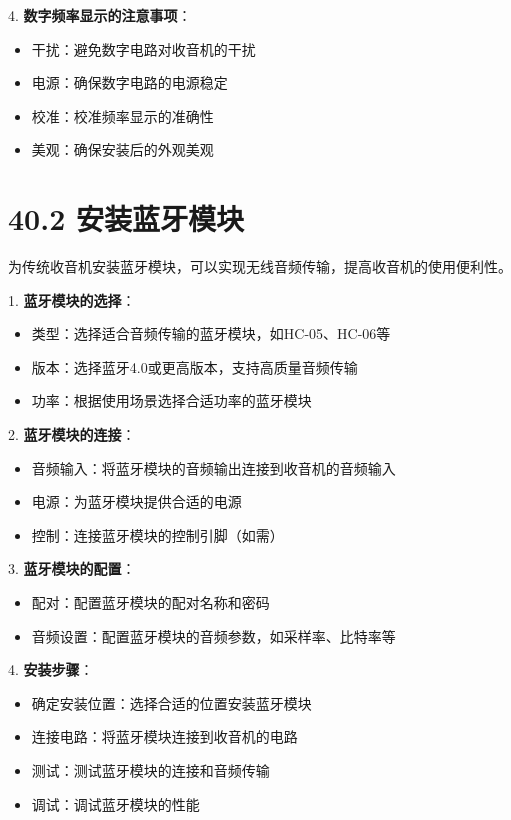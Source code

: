 \documentclass[12pt,UTF8]{ctexbook}
\begin{document}
4. \textbf{数字频率显示的注意事项}：
   \begin{itemize}[leftmargin=3.5em]
   \item 干扰：避免数字电路对收音机的干扰
   \item 电源：确保数字电路的电源稳定
   \item 校准：校准频率显示的准确性
   \item 美观：确保安装后的外观美观
   \end{itemize}

\section*{40.2 安装蓝牙模块}

为传统收音机安装蓝牙模块，可以实现无线音频传输，提高收音机的使用便利性。

1. \textbf{蓝牙模块的选择}：
   \begin{itemize}[leftmargin=3.5em]
   \item 类型：选择适合音频传输的蓝牙模块，如HC-05、HC-06等
   \item 版本：选择蓝牙4.0或更高版本，支持高质量音频传输
   \item 功率：根据使用场景选择合适功率的蓝牙模块
   \end{itemize}

2. \textbf{蓝牙模块的连接}：
   \begin{itemize}[leftmargin=3.5em]
   \item 音频输入：将蓝牙模块的音频输出连接到收音机的音频输入
   \item 电源：为蓝牙模块提供合适的电源
   \item 控制：连接蓝牙模块的控制引脚（如需）
   \end{itemize}

3. \textbf{蓝牙模块的配置}：
   \begin{itemize}[leftmargin=3.5em]
   \item 配对：配置蓝牙模块的配对名称和密码
   \item 音频设置：配置蓝牙模块的音频参数，如采样率、比特率等
   \end{itemize}

4. \textbf{安装步骤}：
   \begin{itemize}[leftmargin=3.5em]
   \item 确定安装位置：选择合适的位置安装蓝牙模块
   \item 连接电路：将蓝牙模块连接到收音机的电路
   \item 测试：测试蓝牙模块的连接和音频传输
   \item 调试：调试蓝牙模块的性能
   \end{itemize}
\end{document}
